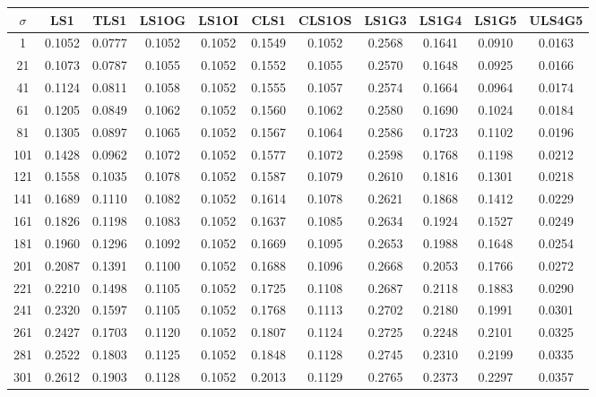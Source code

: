 \begin{table}[ht!]
\centering
\begin{tabular}{c|c|c|c|c|c|c|c|c|c|c}
$\sigma$ & \scriptsize{LS1} & \scriptsize{TLS1} & \scriptsize{LS1OG} & \scriptsize{LS1OI} & \scriptsize{CLS1} & \scriptsize{CLS1OS} & \scriptsize{LS1G3} & \scriptsize{LS1G4} & \scriptsize{LS1G5} & \scriptsize{ULS4G5}\\ \hline 
1 & 0.1052 & 0.0777 & 0.1052 & 0.1052 & 0.1549 & 0.1052 & 0.2568 & 0.1641 & 0.0910 & 0.0163 \\ \hline
21 & 0.1073 & 0.0787 & 0.1055 & 0.1052 & 0.1552 & 0.1055 & 0.2570 & 0.1648 & 0.0925 & 0.0166 \\ \hline
41 & 0.1124 & 0.0811 & 0.1058 & 0.1052 & 0.1555 & 0.1057 & 0.2574 & 0.1664 & 0.0964 & 0.0174 \\ \hline
61 & 0.1205 & 0.0849 & 0.1062 & 0.1052 & 0.1560 & 0.1062 & 0.2580 & 0.1690 & 0.1024 & 0.0184 \\ \hline
81 & 0.1305 & 0.0897 & 0.1065 & 0.1052 & 0.1567 & 0.1064 & 0.2586 & 0.1723 & 0.1102 & 0.0196 \\ \hline
101 & 0.1428 & 0.0962 & 0.1072 & 0.1052 & 0.1577 & 0.1072 & 0.2598 & 0.1768 & 0.1198 & 0.0212 \\ \hline
121 & 0.1558 & 0.1035 & 0.1078 & 0.1052 & 0.1587 & 0.1079 & 0.2610 & 0.1816 & 0.1301 & 0.0218 \\ \hline
141 & 0.1689 & 0.1110 & 0.1082 & 0.1052 & 0.1614 & 0.1078 & 0.2621 & 0.1868 & 0.1412 & 0.0229 \\ \hline
161 & 0.1826 & 0.1198 & 0.1083 & 0.1052 & 0.1637 & 0.1085 & 0.2634 & 0.1924 & 0.1527 & 0.0249 \\ \hline
181 & 0.1960 & 0.1296 & 0.1092 & 0.1052 & 0.1669 & 0.1095 & 0.2653 & 0.1988 & 0.1648 & 0.0254 \\ \hline
201 & 0.2087 & 0.1391 & 0.1100 & 0.1052 & 0.1688 & 0.1096 & 0.2668 & 0.2053 & 0.1766 & 0.0272 \\ \hline
221 & 0.2210 & 0.1498 & 0.1105 & 0.1052 & 0.1725 & 0.1108 & 0.2687 & 0.2118 & 0.1883 & 0.0290 \\ \hline
241 & 0.2320 & 0.1597 & 0.1105 & 0.1052 & 0.1768 & 0.1113 & 0.2702 & 0.2180 & 0.1991 & 0.0301 \\ \hline
261 & 0.2427 & 0.1703 & 0.1120 & 0.1052 & 0.1807 & 0.1124 & 0.2725 & 0.2248 & 0.2101 & 0.0325 \\ \hline
281 & 0.2522 & 0.1803 & 0.1125 & 0.1052 & 0.1848 & 0.1128 & 0.2745 & 0.2310 & 0.2199 & 0.0335 \\ \hline
301 & 0.2612 & 0.1903 & 0.1128 & 0.1052 & 0.2013 & 0.1129 & 0.2765 & 0.2373 & 0.2297 & 0.0357 \\ \hline

\end{tabular}
\end{table}
